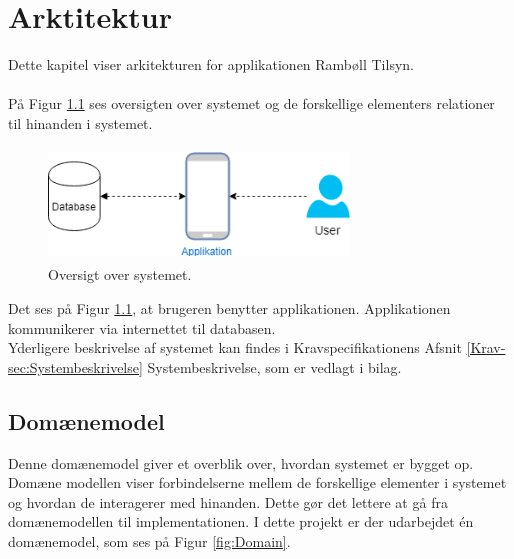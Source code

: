 \chapter{Arktitektur}
Dette kapitel viser arkitekturen for applikationen Rambøll Tilsyn.\label{sec:Arkitektur} \\ \\ 
På Figur \ref{fig:OversigtSystembeskrivelse} ses oversigten over systemet og de forskellige elementers relationer til hinanden i systemet.
\begin{figure}[H] %
	\centering
	\includegraphics[height=3cm, width=8cm]{../ArkitekturDesign/OverordnetArkitektur//Oversigtoversystem}
	\caption{Oversigt over systemet.}
	\label{fig:OversigtSystembeskrivelse}
\end{figure}
Det ses på Figur \ref{fig:OversigtSystembeskrivelse}, at brugeren benytter applikationen. Applikationen kommunikerer via internettet til databasen. \\
Yderligere beskrivelse af systemet kan findes i Kravspecifikationens Afsnit \ref{Krav-sec:Systembeskrivelse} Systembeskrivelse, som er vedlagt i bilag.

\clearpage

\section{Domænemodel}
Denne domænemodel giver et overblik over, hvordan systemet er bygget op. Domæne modellen viser forbindelserne mellem de forskellige elementer i systemet og hvordan de interagerer med hinanden. Dette gør det lettere at gå fra domænemodellen til implementationen.
I dette projekt er der udarbejdet én domænemodel, som ses på Figur \ref{fig:Domain}.


